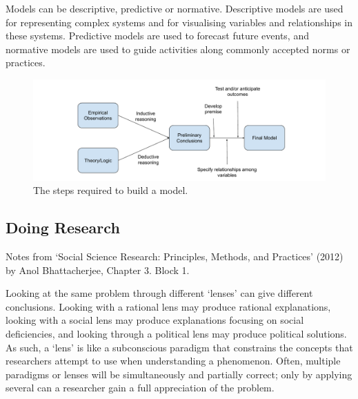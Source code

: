 
Models can be descriptive, predictive or normative. Descriptive models
are used for representing complex systems and for visualising
variables and relationships in these systems. Predictive models are
used to forecast future events, and normative models are used to guide
activities along commonly accepted norms or practices.

\begin{figure}[H]
  \begin{center}
    \includegraphics[width=\textwidth]{model-building.pdf}
  \end{center}
  \caption{The steps required to build a model.}
\end{figure}

\subsection{Doing Research}
\begin{flushright}
  \scriptsize Notes from `Social Science Research: Principles, Methods, and
  Practices' (2012) by Anol Bhattacherjee, Chapter 3. Block 1.
\end{flushright}


Looking at the same problem through different `lenses' can give
different conclusions. Looking with a rational lens may produce
rational explanations, looking with a social lens may produce
explanations focusing on social deficiencies, and looking through a
political lens may produce political solutions. As such, a `lens' is
like a subconscious paradigm that constrains the concepts that
researchers attempt to use when understanding a phenomenon. Often,
multiple paradigms or lenses will be simultaneously and partially
correct; only by applying several can a researcher gain a full
appreciation of the problem.

